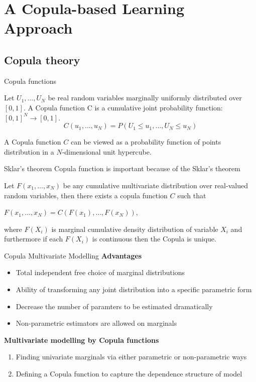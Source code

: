 \section{A Copula-based Learning Approach}
\subsection{Copula theory}
\begin{frame}{Copula functions}
\begin{definition}
Let $U_1,\ldots,U_N$ be real random variables marginally uniformly distributed over $\left[0,1\right]$. A Copula function C is a cumulative joint probability function: $\left[0,1\right]^N \rightarrow \left[0,1\right]$.
\[
C\left(u_1,\ldots ,u_N\right)=P\left(U_1\leq u_1,\ldots ,U_N\leq u_N\right)
\]
\end{definition}	
A Copula function $C$ can be viewed as a probability function of points
distribution in a $N$-dimensional unit hypercube.
\end{frame}
\begin{frame}{Sklar's theorem}
Copula function is important because of the Sklar's theorem
\begin{theorem}[Sklar 1959]
Let $F\left(x_1,\ldots,x_N\right)$ be any cumulative multivariate distribution over real-valued random variables, then there exists a copula function $C$ such that
\begin{center}
$F\left(x_1,\ldots,x_N\right) = C\left(F\left(x_1\right),\ldots,F\left(x_N\right)\right)$,
\end{center}
where $F\left(X_i\right)$ is marginal cumulative density distribution
of variable $X_i$ and furthermore if each $F\left(X_i\right)$ is continuous then the Copula is unique.
\end{theorem}
\end{frame}
\begin{frame}{Copula Multivariate Modelling}
\textbf{Advantages}
\begin{itemize}
\item Total independent free choice of marginal distributions
\item Ability of transforming any joint distribution into a specific parametric form
\item Decrease the number of paramters to be estimated dramatically 
\item Non-parametric estimators are allowed on marginals
\end{itemize}\pause
\textbf{Multivariate modelling by Copula functions}
\begin{enumerate}[<+->]
\item Finding univariate marginals via either parametric or non-parametric ways
\item Defining a Copula function to capture the dependence structure of model
\end{enumerate}
\end{frame}
